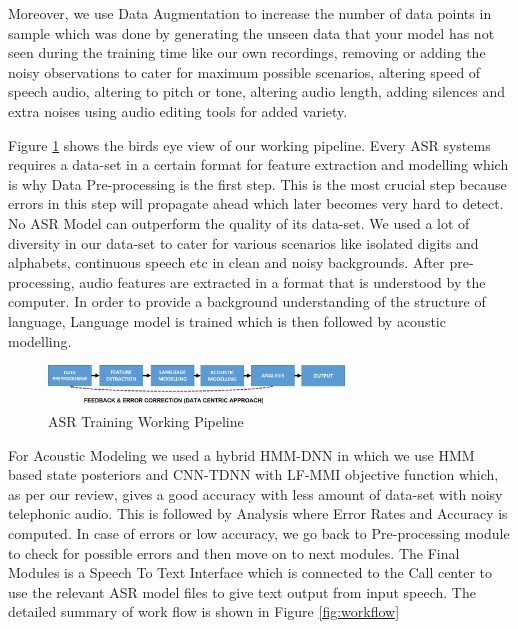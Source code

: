 \documentclass{article}
\begin{document}
Moreover, we use Data Augmentation to increase the number of data points in sample which was done by generating the unseen data that your model has not seen during the training time like our own recordings, removing or adding the noisy observations to cater for maximum possible scenarios, altering speed of speech audio, altering to pitch or tone, altering audio length, adding silences and extra noises using audio editing tools \cite{audacity_linux_nodate} for added variety.

Figure \ref{fig:working_pipeline_short} shows the birds eye view of our working pipeline. Every ASR systems requires a data-set in a certain format for feature extraction and modelling which is why Data Pre-processing is the first step. This is the most crucial step because errors in this step will propagate ahead which later becomes very hard to detect. No ASR Model can outperform the quality of its data-set. We used a lot of diversity in our data-set to cater for various scenarios like isolated digits and alphabets, continuous speech etc in clean and noisy backgrounds. After pre-processing, audio features are extracted in a format that is understood by the computer. In order to provide a background understanding of the structure of language, Language model is trained which is then followed by acoustic modelling. 

\begin{figure}[h]
    \centering
    \includegraphics[width=0.7\textwidth]{img/working-pipeline-short.png}
    \caption{ASR Training Working Pipeline}
    \label{fig:working_pipeline_short}
\end{figure}


For Acoustic Modeling we used a hybrid HMM-DNN in which we use HMM based state posteriors and CNN-TDNN with LF-MMI objective function which, as per our review, gives a good accuracy with less amount of data-set with noisy telephonic audio. This is followed by Analysis where Error Rates and Accuracy is computed. In case of errors or low accuracy, we go back to Pre-processing module to check for possible errors and then move on to next modules. The Final Modules is a Speech To Text Interface which is connected to the Call center to use the relevant ASR model files to give text output from input speech. The detailed summary of work flow is shown in Figure 
\ref{fig:workflow}
\end{document}
